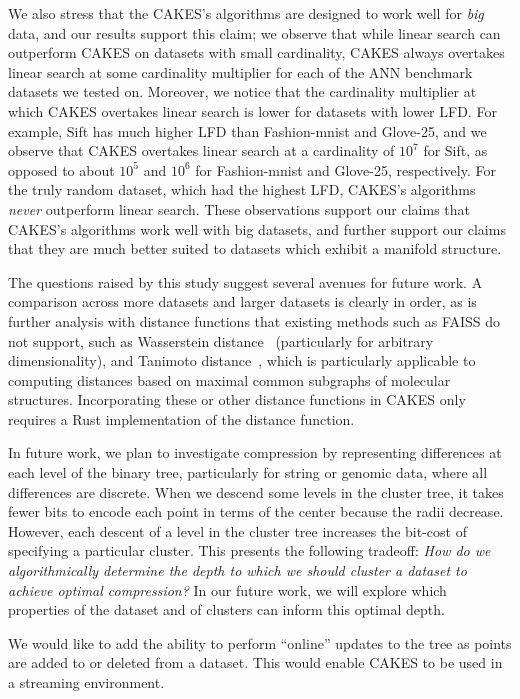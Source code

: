 We also stress that the CAKES's algorithms are designed to work well for \emph{big} data, and our results support this claim; we observe that while linear search can outperform CAKES on datasets with small cardinality, CAKES always overtakes linear search at some cardinality multiplier for each of the ANN benchmark datasets we tested on. Moreover, we notice that the cardinality multiplier at which CAKES overtakes linear search is lower for datasets with lower LFD. For example, Sift has much higher LFD than Fashion-mnist and Glove-25, and we observe that CAKES overtakes linear search at a cardinality of $10^7$ for Sift, as opposed to about $10^5$ and $10^6$ for Fashion-mnist and Glove-25, respectively. For the truly random dataset, which had the highest LFD, CAKES's algorithms \emph{never} outperform linear search. These observations support our claims that CAKES's algorithms work well with big datasets, and further support our claims that they are much better suited to datasets which exhibit a manifold structure.


The questions raised by this study suggest several avenues for future work.
A comparison across more datasets and larger datasets is clearly in order, as is further analysis with distance functions that existing methods such as FAISS do not support, such as Wasserstein distance~\cite{vallender1974calculation} (particularly for arbitrary dimensionality), and Tanimoto distance~\cite{bajusz2015tanimoto}, which is particularly applicable to computing distances based on maximal common subgraphs of molecular structures.  %
Incorporating these or other distance functions in CAKES only requires a Rust implementation of the distance function.


In future work, we plan to investigate compression by representing differences at each level of the binary tree, particularly for string or genomic data, where all differences are discrete.
When we descend some levels in the cluster tree, it takes fewer bits to encode each point in terms of the center because the radii decrease.
However, each descent of a level in the cluster tree increases the bit-cost of specifying a particular cluster. 
This presents the following tradeoff:
\emph{How do we algorithmically determine the depth to which we should cluster a dataset to achieve optimal compression?} 
In our future work, we will explore which properties of the dataset and of clusters can inform this optimal depth.

We would like to add the ability to perform ``online'' updates to the tree as points are added to or deleted from a dataset.
This would enable CAKES to be used in a streaming environment.

